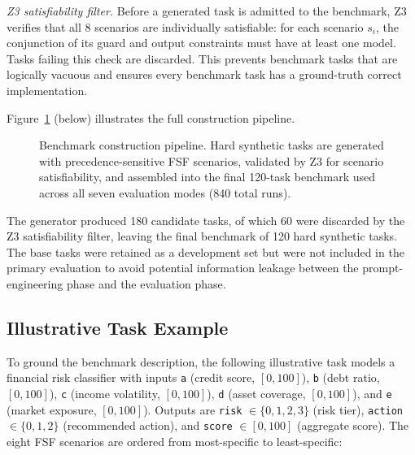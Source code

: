 \emph{Z3 satisfiability filter.}  Before a generated task is admitted to the
benchmark, Z3 verifies that all 8 scenarios are individually satisfiable: for each
scenario $s_i$, the conjunction of its guard and output constraints must have at
least one model.  Tasks failing this check are discarded.  This prevents benchmark
tasks that are logically vacuous and ensures every benchmark task has a ground-truth
correct implementation.

Figure~\ref{fig:benchmark-pipeline} (below) illustrates the full construction
pipeline.

\begin{figure}[t]
  \centering
  \caption{Benchmark construction pipeline.  Hard synthetic tasks are generated with
    precedence-sensitive FSF scenarios, validated by Z3 for scenario satisfiability,
    and assembled into the final 120-task benchmark used across all seven evaluation
    modes (840 total runs).}
  \label{fig:benchmark-pipeline}
\end{figure}

The generator produced 180 candidate tasks, of which 60 were discarded by the Z3
satisfiability filter, leaving the final benchmark of 120 hard synthetic tasks.  The
base tasks were retained as a development set but were not included in the primary
evaluation to avoid potential information leakage between the prompt-engineering
phase and the evaluation phase.

\subsection{Illustrative Task Example}

To ground the benchmark description, the following illustrative task models a financial risk classifier with
inputs \texttt{a} (credit score, $[0,100]$), \texttt{b} (debt ratio, $[0,100]$),
\texttt{c} (income volatility, $[0,100]$), \texttt{d} (asset coverage, $[0,100]$),
and \texttt{e} (market exposure, $[0,100]$).  Outputs are \texttt{risk} $\in
\{0,1,2,3\}$ (risk tier), \texttt{action} $\in \{0,1,2\}$ (recommended action),
and \texttt{score} $\in [0,100]$ (aggregate score).  The eight FSF scenarios are
ordered from most-specific to least-specific:

